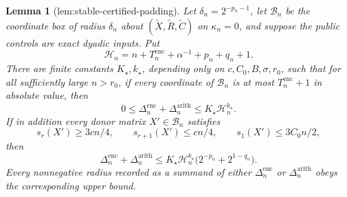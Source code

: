 \documentclass{article}
\newtheorem{lemma}{Lemma}
\begin{document}
\begin{lemma}[lem:stable-certified-padding]\label{lem:stable-certified-padding}
Let \(\delta_n=2^{-p_n-1}\), let \(\mathcal B_n\) be the coordinate box of radius \(\delta_n\) about \((\widetilde X,\widetilde R,\widetilde C)\) on \(\kappa_n=0\), and suppose the public controls are exact dyadic inputs.  Put
\[
\mathcal H_n=n+T_n^{\mathrm{enc}}+\alpha^{-1}+p_n+q_n+1.
\]
There are finite constants \(K_\star,k_\star\), depending only on \(c,C_0,B,\sigma,r_0\), such that for all sufficiently large \(n>r_0\), if every coordinate of \(\mathcal B_n\) is at most \(T_n^{\mathrm{enc}}+1\) in absolute value, then
\[
0\le\Delta_n^{\mathrm{enc}}+\Delta_n^{\mathrm{arith}}
\le K_\star\mathcal H_n^{k_\star}.
\]
If in addition every donor matrix \(X'\in\mathcal B_n\) satisfies
\[
s_r(X')\ge3cn/4,\qquad s_{r+1}(X')\le cn/4,
\qquad s_1(X')\le3C_0n/2,
\]
then
\[
\Delta_n^{\mathrm{enc}}+\Delta_n^{\mathrm{arith}}
\le K_\star\mathcal H_n^{k_\star}
\bigl(2^{-p_n}+2^{1-q_n}\bigr).
\]
Every nonnegative radius recorded as a summand of either \(\Delta_n^{\mathrm{enc}}\) or \(\Delta_n^{\mathrm{arith}}\) obeys the corresponding upper bound.
\end{lemma}
\end{document}
